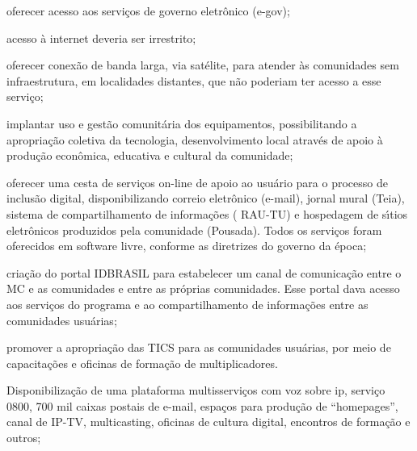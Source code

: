 \documentclass[
12pt,		%
openright,	%
twoside,  %
a4paper,			%
chapter=TITLE,		%
english,			%
french,				%
spanish,			%
brazil				%
]{USPSC-classe/USPSC}
\begin{document}
\begin{alineas}
\item oferecer acesso aos servi\c{c}os de governo eletr\^onico (e-gov);
\item acesso \`a internet deveria ser irrestrito;
\item oferecer conex\~ao de banda larga, via sat\'elite, para atender \`as comunidades sem infraestrutura,  em localidades distantes, que n\~ao poderiam ter acesso a esse servi\c{c}o;
\item implantar uso e gest\~ao comunit\'aria dos equipamentos, possibilitando a apropria\c{c}\~ao coletiva  da tecnologia,  desenvolvimento local atrav\'es de apoio \`a produ\c{c}\~ao econ\^omica, educativa e cultural da comunidade;
\item oferecer uma cesta de servi\c{c}os on-line de apoio ao usu\'ario para o processo de inclus\~ao digital, disponibilizando correio eletr\^onico (e-mail),  jornal mural (Teia), sistema de compartilhamento de informa\c{c}\~oes ( RAU-TU) e hospedagem de s\'{\i}tios eletr\^onicos produzidos pela comunidade (Pousada). Todos os servi\c{c}os  foram oferecidos em software livre, conforme as diretrizes do governo da \'epoca;
\item cria\c{c}\~ao do portal IDBRASIL para estabelecer um canal de comunica\c{c}\~ao entre o MC e as comunidades e entre as pr\'oprias comunidades. Esse portal dava acesso aos servi\c{c}os do programa e ao compartilhamento  de informa\c{c}\~oes  entre as comunidades usu\'arias;
\item promover a apropria\c{c}\~ao das TICS  para as comunidades usu\'arias, por meio de  capacita\c{c}\~oes e oficinas de forma\c{c}\~ao de multiplicadores.
\item Disponibiliza\c{c}\~ao de uma plataforma multisservi\c{c}os com voz sobre ip, servi\c{c}o 0800, 700 mil caixas postais de e-mail, espa\c{c}os para produ\c{c}\~ao de “homepages”, canal de IP-TV, multicasting, oficinas de cultura digital, encontros de forma\c{c}\~ao e outros;
\end{alineas}
\end{document}
